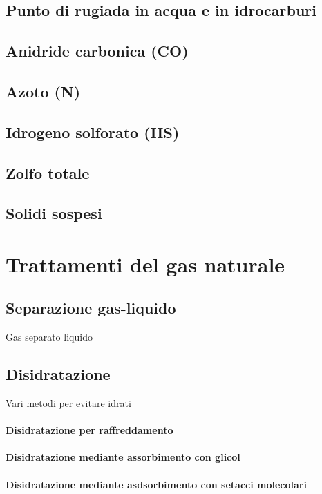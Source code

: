 \subsection{Punto di rugiada in acqua e in idrocarburi}
\subsection{Anidride carbonica (CO)}
\subsection{Azoto (N)}
\subsection{Idrogeno solforato (HS)}
\subsection{Zolfo totale}
\subsection{Solidi sospesi}

\section{Trattamenti del gas naturale}
\subsection{Separazione gas-liquido}
Gas separato liquido

\subsection{Disidratazione}
Vari metodi per evitare idrati
\paragraph{Disidratazione per raffreddamento}
\paragraph{Disidratazione mediante assorbimento con glicol}
\paragraph{Disidratazione mediante asdsorbimento con setacci molecolari}

